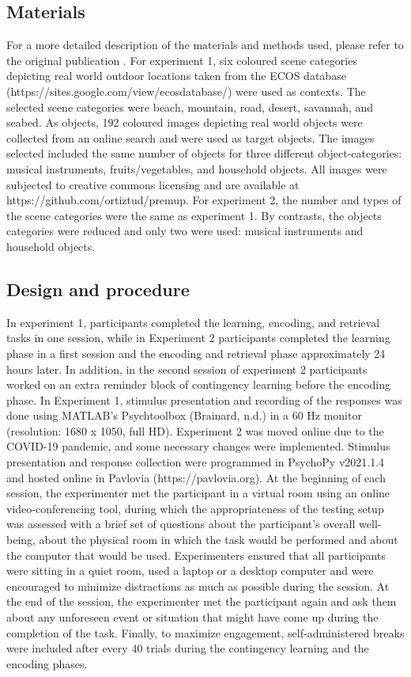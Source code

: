 \documentclass[a4paper,12pt]{article}
\begin{document}
\subsection{Materials}
For a more detailed description of the materials and methods used, please refer to the original publication \citep{ortiz2021not}. For experiment 1, six coloured scene categories depicting real world outdoor locations taken from the ECOS database (https://sites.google.com/view/ecosdatabase/) were used as contexts. The selected scene categories were beach, mountain, road, desert, savannah, and seabed. As objects, 192 coloured images depicting real world objects were collected from an online search and were used as target objects. The images selected included the same number of objects for three different object-categories: musical instruments, fruits/vegetables, and household objects. All images were subjected to creative commons licensing and are available at https://github.com/ortiztud/premup. 
For experiment 2, the number and types of the scene categories were the same as experiment 1. By contrasts, the objects categories were reduced and only two were used: musical instruments and household objects. 
\subsection{Design and procedure}
In experiment 1, participants completed the learning, encoding, and retrieval tasks in one session, while in Experiment 2 participants completed the learning phase in a first session and the encoding and retrieval phase approximately 24 hours later. In addition, in the second session of experiment 2 participants worked on an extra reminder block of contingency learning before the encoding phase. 
In Experiment 1, stimulus presentation and recording of the responses was done using MATLAB’s Psychtoolbox (Brainard, n.d.) in a 60 Hz monitor (resolution: 1680 x 1050, full HD). 
 Experiment 2 was moved online due to the COVID-19 pandemic, and some necessary changes were implemented. Stimulus presentation and response collection were programmed in PsychoPy v2021.1.4 and hosted online in Pavlovia (https://pavlovia.org). At the beginning of each session, the experimenter met the participant in a virtual room using an online video-conferencing tool, during which the appropriateness of the testing setup was assessed with a brief set of questions about the participant’s overall well-being, about the physical room in which the task would be performed and about the computer that would be used. Experimenters ensured that all participants were sitting in a quiet room, used a laptop or a desktop computer and were encouraged to minimize distractions as much as possible during the session. At the end of the session, the experimenter met the participant again and ask them about any unforeseen event or situation that might have come up during the completion of the task. Finally, to maximize engagement, self-administered breaks were included after every 40 trials during the contingency learning and the encoding phases. 
\end{document}
